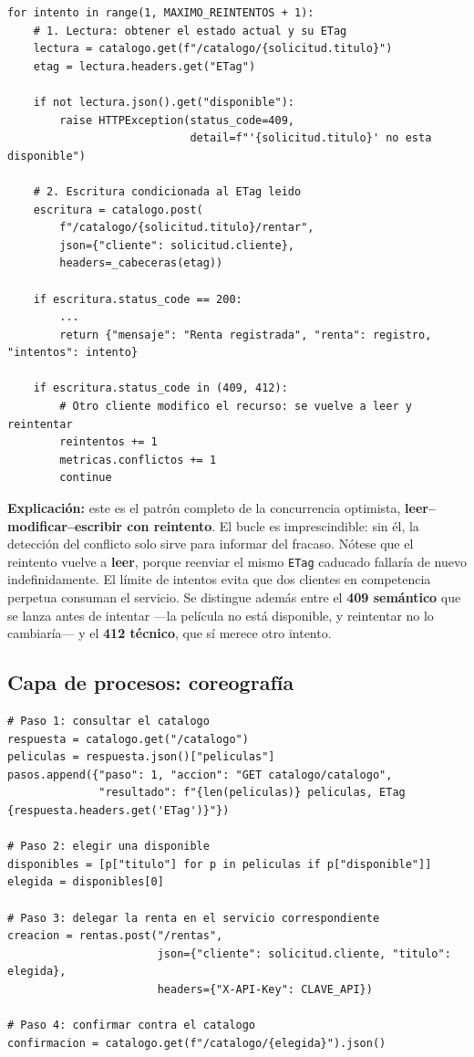 \documentclass[12pt]{article}
\begin{document}
\begin{lstlisting}[caption={El servicio de rentas absorbe los conflictos (rentas.py)}]
for intento in range(1, MAXIMO_REINTENTOS + 1):
    # 1. Lectura: obtener el estado actual y su ETag
    lectura = catalogo.get(f"/catalogo/{solicitud.titulo}")
    etag = lectura.headers.get("ETag")

    if not lectura.json().get("disponible"):
        raise HTTPException(status_code=409,
                            detail=f"'{solicitud.titulo}' no esta disponible")

    # 2. Escritura condicionada al ETag leido
    escritura = catalogo.post(
        f"/catalogo/{solicitud.titulo}/rentar",
        json={"cliente": solicitud.cliente},
        headers=_cabeceras(etag))

    if escritura.status_code == 200:
        ...
        return {"mensaje": "Renta registrada", "renta": registro, "intentos": intento}

    if escritura.status_code in (409, 412):
        # Otro cliente modifico el recurso: se vuelve a leer y reintentar
        reintentos += 1
        metricas.conflictos += 1
        continue
\end{lstlisting}

\noindent\textbf{Explicación:} este es el patrón completo de la concurrencia optimista, \textbf{leer--modificar--escribir con reintento}. El bucle es imprescindible: sin él, la detección del conflicto solo sirve para informar del fracaso. Nótese que el reintento vuelve a \textbf{leer}, porque reenviar el mismo \texttt{ETag} caducado fallaría de nuevo indefinidamente. El límite de intentos evita que dos clientes en competencia perpetua consuman el servicio. Se distingue además entre el \textbf{409 semántico} que se lanza antes de intentar —la película no está disponible, y reintentar no lo cambiaría— y el \textbf{412 técnico}, que sí merece otro intento.

\subsection{Capa de procesos: coreografía}

\begin{lstlisting}[caption={Secuencia completa del proceso de negocio (agregador.py)}]
# Paso 1: consultar el catalogo
respuesta = catalogo.get("/catalogo")
peliculas = respuesta.json()["peliculas"]
pasos.append({"paso": 1, "accion": "GET catalogo/catalogo",
              "resultado": f"{len(peliculas)} peliculas, ETag {respuesta.headers.get('ETag')}"})

# Paso 2: elegir una disponible
disponibles = [p["titulo"] for p in peliculas if p["disponible"]]
elegida = disponibles[0]

# Paso 3: delegar la renta en el servicio correspondiente
creacion = rentas.post("/rentas",
                       json={"cliente": solicitud.cliente, "titulo": elegida},
                       headers={"X-API-Key": CLAVE_API})

# Paso 4: confirmar contra el catalogo
confirmacion = catalogo.get(f"/catalogo/{elegida}").json()
\end{lstlisting}
\end{document}
